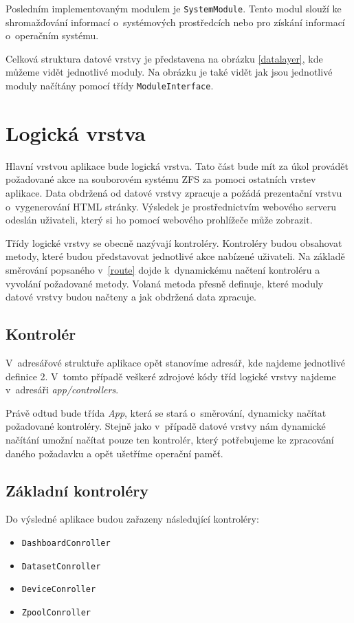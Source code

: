     Posledním implementovaným modulem je \verb|SystemModule|. Tento modul slouží ke shromažďování informací o~systémových prostředcích nebo pro získání informací o~operačním systému.
    
    Celková struktura datové vrstvy je představena na obrázku \ref{datalayer}, kde můžeme vidět jednotlivé moduly. Na obrázku je také vidět jak jsou jednotlivé moduly načítány pomocí třídy \verb|ModuleInterface|.
    
\section{Logická vrstva}
Hlavní vrstvou aplikace bude logická vrstva. Tato část bude mít za úkol provádět požadované akce na souborovém systému ZFS za pomoci ostatních vrstev aplikace. Data obdržená od datové vrstvy zpracuje a požádá prezentační vrstvu o~vygenerování HTML stránky. Výsledek je prostřednictvím webového serveru odeslán uživateli, který si ho pomocí webového prohlížeče může zobrazit.

Třídy logické vrstvy se obecně nazývají kontroléry. Kontroléry budou obsahovat metody, které budou představovat jednotlivé akce nabízené uživateli. Na základě směrování popsaného v~\ref{route} dojde k~dynamickému načtení kontroléru a vyvolání požadované metody. Volaná metoda přesně definuje, které moduly datové vrstvy budou načteny a jak obdržená data zpracuje.
    \subsection{Kontrolér}
    V~adresářové struktuře aplikace opět stanovíme adresář, kde najdeme jednotlivé definice 2. V~tomto případě veškeré zdrojové kódy tříd logické vrstvy najdeme v~adresáři \emph{app/controllers}.

    Právě odtud bude třída \emph{App}, která se stará o~směrování, dynamicky načítat požadované kontroléry. Stejně jako v~případě datové vrstvy nám dynamické načítání umožní načítat pouze ten kontrolér, který potřebujeme ke zpracování daného požadavku a opět ušetříme operační paměť.

    \subsection{Základní kontroléry}
    Do výsledné aplikace budou zařazeny následující kontroléry:
    \begin{itemize}
      \item \verb|DashboardConroller|
      \item \verb|DatasetConroller|
      \item \verb|DeviceConroller|
      \item \verb|ZpoolConroller|
    \end{itemize}

